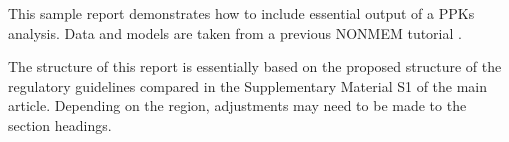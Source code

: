 This sample report demonstrates how to include essential output of a \glspl{PPK} analysis. Data and models are taken from a previous NONMEM tutorial \autocite{Bauer2019}.

The structure of this report is essentially based on the proposed structure of the regulatory guidelines compared in the Supplementary Material S1 of the main article. Depending on the region, adjustments may need to be made to the section headings.
 
